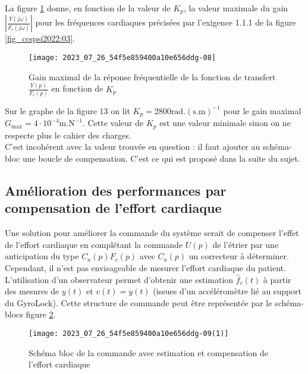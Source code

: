 La figure \ref{fig_ccspsi2022:13} donne, en fonction de la valeur de $K_{p}$, la valeur maximale du gain $\left|\frac{Y(j \omega)}{F_{c}(j \omega)}\right|$ pour les fréquences cardiaques précisées par l'exigence 1.1.1 de la figure \ref{fig_ccspsi2022:03}.


\begin{figure}[!h]
\centering
\texttt{[image: 2023\_07\_26\_54f5e859400a10e656ddg-08]}
\caption{\label{fig_ccspsi2022:13}Gain maximal de la réponse fréquentielle de la fonction de transfert $\frac{Y(p)}{F_{c}(p)}$ en fonction de $K_{p}$}
\end{figure}

\ifprof
\begin{corrige}
Sur le graphe de la figure 13 on lit $K_p = 2800 \text{rad}.(\text{s.m})^{-1}$ pour le gain maximal $G_{\text{max}} = 4\cdot 10^{-4}\text{m}.\text{N}^{-1}$. Cette valeur de $K_p$ est une valeur minimale sinon on ne respecte plus le cahier des charges.\\

C'est incohérent avec la valeur trouvée en question \label{q:22}: il faut ajouter au schéma-bloc une boucle de compensation. C'est ce qui est proposé dans la suite du sujet.
\end{corrige}
\else
\fi


\subsection{\label{sec:III.C} Amélioration des performances par compensation de l'effort cardiaque}
Une solution pour améliorer la commande du système serait de compenser l'effet de l'effort cardiaque en complétant la commande $U(p)$ de l'étrier par une anticipation du type $C_{a}(p) F_{c}(p)$ avec $C_{a}(p)$ un correcteur à déterminer. Cependant, il n'est pas envisageable de mesurer l'effort cardiaque du patient. L'utilisation d'un observateur permet d'obtenir une estimation $\hat{f}_{c}(t)$ à partir des mesures de $y(t)$ et $v(t)=\dot{y}(t)$ (issues d'un accéléromètre lié au support du GyroLock). Cette structure de commande peut être représentée par le schéma-blocs figure \ref{fig_ccspsi2022:14}.

\begin{figure}[!h]
\centering
\texttt{[image: 2023\_07\_26\_54f5e859400a10e656ddg-09(1)]}
\caption{\label{fig_ccspsi2022:14}Schéma bloc de la commande avec estimation et compensation de l'effort cardiaque}
\end{figure}

